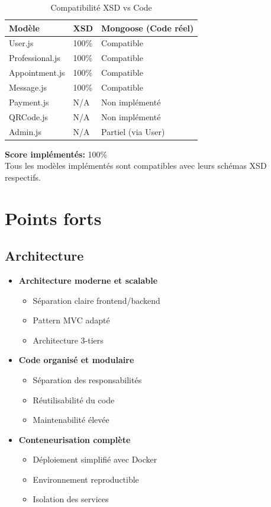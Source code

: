 \documentclass[12pt,a4paper]{article}
\begin{document}
\begin{table}[h]
\centering
\begin{tabular}{|l|l|l|}
\hline
\textbf{Modèle} & \textbf{XSD} & \textbf{Mongoose (Code réel)} \\
\hline
User.js & 100\% & Compatible \\
Professional.js & 100\% & Compatible \\
Appointment.js & 100\% & Compatible \\
Message.js & 100\% & Compatible \\
Payment.js & N/A & Non implémenté \\
QRCode.js & N/A & Non implémenté \\
Admin.js & N/A & Partiel (via User) \\
\hline
\end{tabular}
\caption{Compatibilité XSD vs Code}
\end{table}

\textbf{Score implémentés:} 100\% \\
Tous les modèles implémentés sont compatibles avec leurs schémas XSD respectifs.

\section{Points forts}

\subsection{Architecture}

\begin{itemize}
    \item[\checkmark] \textbf{Architecture moderne et scalable}
        \begin{itemize}
            \item Séparation claire frontend/backend
            \item Pattern MVC adapté
            \item Architecture 3-tiers
        \end{itemize}
    \item[\checkmark] \textbf{Code organisé et modulaire}
        \begin{itemize}
            \item Séparation des responsabilités
            \item Réutilisabilité du code
            \item Maintenabilité élevée
        \end{itemize}
    \item[\checkmark] \textbf{Conteneurisation complète}
        \begin{itemize}
            \item Déploiement simplifié avec Docker
            \item Environnement reproductible
            \item Isolation des services
        \end{itemize}
\end{itemize}
\end{document}
